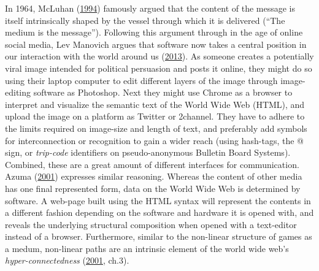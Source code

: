 \documentclass[10pt,british,A4paper,oneside]{memoir}
\begin{document}
In 1964, McLuhan
(\protect\hyperlink{ref-mcluhan_understanding_1994}{1994}) famously
argued that the content of the message is itself intrinsically shaped by
the vessel through which it is delivered (``The medium is the
message''). Following this argument through in the age of online social
media, Lev Manovich argues that software now takes a central position in
our interaction with the world around us
(\protect\hyperlink{ref-manovich_software_2013}{2013}). As someone
creates a potentially viral image intended for political persuasion and
posts it online, they might do so using their laptop computer to edit
different layers of the image through image-editing software as
Photoshop. Next they might use Chrome as a browser to interpret and
visualize the semantic text of the World Wide Web (HTML), and upload the
image on a platform as Twitter or 2channel. They have to adhere to the
limits required on image-size and length of text, and preferably add
symbols for interconnection or recognition to gain a wider reach (using
hash-tags, the @ sign, or \emph{trip-code} identifiers on
pseudo-anonymous Bulletin Board Systems). Combined, these are a great
amount of different interfaces for communication. Azuma
(\protect\hyperlink{ref-azuma_otaku:_2001}{2001}) expresses similar
reasoning. Whereas the content of other media has one final represented
form, data on the World Wide Web is determined by software. A web-page
built using the HTML syntax will represent the contents in a different
fashion depending on the software and hardware it is opened with, and
reveals the underlying structural composition when opened with a
text-editor instead of a browser. Furthermore, similar to the non-linear
structure of games as a medum, non-linear paths are an intrinsic element of the
world wide web's \emph{hyper-connectedness}
(\protect\hyperlink{ref-azuma_otaku:_2001}{2001}, ch.3).
\end{document}
